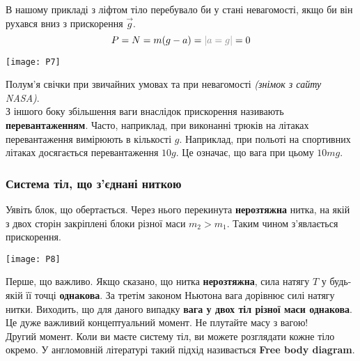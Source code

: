 \documentclass[a4paper,12pt]{article}
\begin{document}

В нашому прикладі з ліфтом тіло перебувало би у стані невагомості, якщо би він рухався вниз з прискорення $\vec{g}$. $$P = N = m(g-a) = \textcolor{gray}{|a = g|} = 0$$

\begin{center}
\texttt{[image: P7]}
\end{center}
Полум'я свічки при звичайних умовах та при невагомості \textit{(знімок з сайту NASA)}.\\

З іншого боку збільшення ваги внаслідок прискорення називають \textcolor{EdErablue}{\textbf{перевантаженням}}. Часто, наприклад, при виконанні трюків на літаках перевантаження вимірюють в кількості $g$. Наприклад, при польоті на спортивних літаках досягається перевантаження $10g$. Це означає, що вага при цьому $10mg$. 
\newpage

\subsubsection{Система тіл, що з'єднані ниткою}
Уявіть блок, що обертається. Через нього перекинута \textbf{нерозтяжна} нитка, на якій з двох сторін закріплені блоки різної маси $m_2 > m_1$. Таким чином з'явлається прискорення.
\begin{center}
\texttt{[image: P8]}
\end{center}
Перше, що важливо. Якщо сказано, що нитка \textbf{нерозтяжна}, сила натягу $T$ у будь-якій її точці \textbf{однакова}. За третім законом Ньютона вага дорівнює силі натягу нитки. Виходить, що для даного випадку \textcolor{EdErablue}{\textbf{вага у двох тіл різної маси однакова}}. Це дуже важливий концептуальний момент. Не плутайте масу з вагою!\\

\hspace{-0.75cm} Другий момент. Коли ви маєте систему тіл, ви можете розглядати кожне тіло окремо. У англомовній літературі такий підхід називається \textcolor{EdErablue}{\textbf{Free body diagram}}.\\
\end{document}
